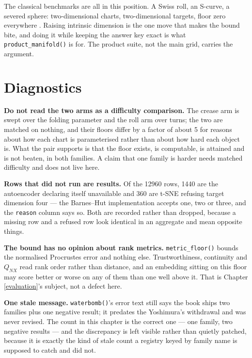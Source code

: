 \documentclass[
  british,
  a4paper,
]{book}
\begin{document}
The classical benchmarks are all in this position. A Swiss roll, an S-curve, a
severed sphere: two-dimensional charts, two-dimensional targets, floor zero
everywhere \citep{lee2007nonlinear}. Raising intrinsic dimension is the one move that
makes the bound bite, and doing it while keeping the answer key exact is what
\texttt{product\_manifold()} is for. The product suite, not the main grid, carries the
argument.

\section{Diagnostics}\label{bench-diagnostics}

\textbf{Do not read the two arms as a difficulty comparison.} The crease arm is swept
over the folding parameter and the roll arm over turns; the two are matched on
nothing, and their floors differ by a factor of about
5 for reasons about how each
chart is parameterised rather than about how hard each object is. What the pair
supports is that the floor exists, is computable, is attained and is not beaten,
in both families. A claim that one family is harder needs matched difficulty and
does not live here.

\textbf{Rows that did not run are results.} Of the 12960 rows,
1440 are the autoencoder declaring itself
unavailable and 360 are t-SNE refusing target
dimension four --- the Barnes--Hut implementation accepts one, two or three, and
the \texttt{reason} column says so. Both are recorded rather than dropped, because a
missing row and a refused row look identical in an aggregate and mean opposite
things.

\textbf{The bound has no opinion about rank metrics.} \texttt{metric\_floor()} bounds the
normalised Procrustes error and nothing else. Trustworthiness, continuity and
\(Q_{NX}\) read rank order rather than distance, and an embedding sitting on this
floor may score better or worse on any of them than one well above it. That is
Chapter \ref{evaluation}'s subject, not a defect here.

\textbf{One stale message.} \texttt{waterbomb()}'s error text still says the book ships two
families plus one negative result; it predates the Yoshimura's withdrawal and
was never revised. The count in this chapter is the correct one --- one family,
two negative results --- and the discrepancy is left visible rather than quietly
patched, because it is exactly the kind of stale count a registry keyed by
family name is supposed to catch and did not.
\end{document}
